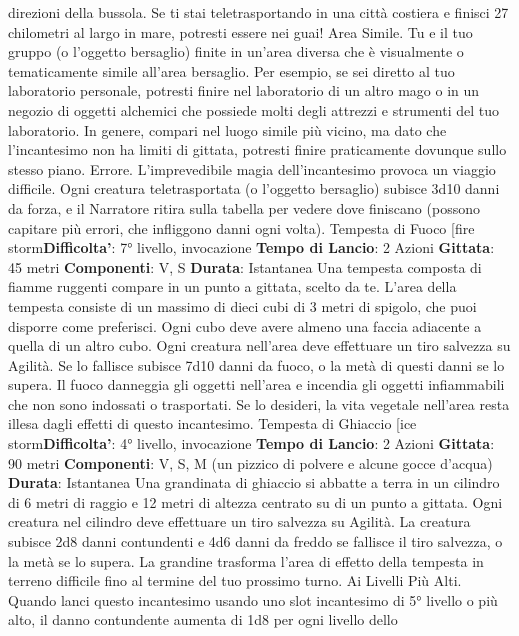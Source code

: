 \begin{multicols}{2}
direzioni della bussola. Se ti stai teletrasportando in una
città costiera e finisci 27 chilometri al largo in mare,
potresti essere nei guai!
Area Simile. Tu e il tuo gruppo (o l’oggetto bersaglio)
finite in un’area diversa che è visualmente o
tematicamente simile all’area bersaglio. Per esempio,
se sei diretto al tuo laboratorio personale, potresti finire
nel laboratorio di un altro mago o in un negozio di
oggetti alchemici che possiede molti degli attrezzi e
strumenti del tuo laboratorio. In genere, compari nel
luogo simile più vicino, ma dato che l’incantesimo non
ha limiti di gittata, potresti finire praticamente dovunque
sullo stesso piano.
Errore. L’imprevedibile magia dell’incantesimo provoca
un viaggio difficile. Ogni creatura teletrasportata (o
l’oggetto bersaglio) subisce 3d10 danni da forza, e il
Narratore ritira sulla tabella per vedere dove finiscano
(possono capitare più errori, che infliggono danni ogni
volta).
Tempesta di Fuoco
[fire storm\textbf{Difficolta'}:
7° livello, invocazione
\textbf{Tempo di Lancio}: 2 Azioni
\textbf{Gittata}: 45 metri
\textbf{Componenti}: V, S
\textbf{Durata}: Istantanea
Una tempesta composta di fiamme ruggenti compare in
un punto a gittata, scelto da te. L’area della tempesta
consiste di un massimo di dieci cubi di 3 metri di
spigolo, che puoi disporre come preferisci. Ogni cubo
deve avere almeno una faccia adiacente a quella di un
altro cubo. Ogni creatura nell’area deve effettuare un
tiro salvezza su Agilità. Se lo fallisce subisce 7d10
danni da fuoco, o la metà di questi danni se lo supera.
Il fuoco danneggia gli oggetti nell’area e incendia gli
oggetti infiammabili che non sono indossati o
trasportati. Se lo desideri, la vita vegetale nell’area
resta illesa dagli effetti di questo incantesimo.
Tempesta di Ghiaccio
[ice storm\textbf{Difficolta'}:
4° livello, invocazione
\textbf{Tempo di Lancio}: 2 Azioni
\textbf{Gittata}: 90 metri
\textbf{Componenti}: V, S, M (un pizzico di polvere e alcune
gocce d’acqua)
\textbf{Durata}: Istantanea
Una grandinata di ghiaccio si abbatte a terra in un
cilindro di 6 metri di raggio e 12 metri di altezza centrato
su di un punto a gittata. Ogni creatura nel cilindro deve
effettuare un tiro salvezza su Agilità. La creatura
subisce 2d8 danni contundenti e 4d6 danni da freddo
se fallisce il tiro salvezza, o la metà se lo supera.
La grandine trasforma l’area di effetto della tempesta in
terreno difficile fino al termine del tuo prossimo turno.
Ai Livelli Più Alti. Quando lanci questo incantesimo
usando uno slot incantesimo di 5° livello o più alto, il
danno contundente aumenta di 1d8 per ogni livello dello

\end{multicols}

